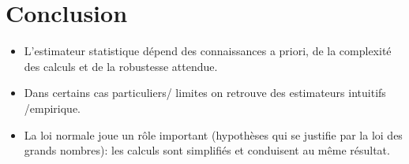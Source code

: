 \documentclass[main.tex]{subfiles}
\begin{document}
\section{Conclusion}
\begin{itemize}
\item L'estimateur statistique dépend des connaissances a priori, de la complexité des calculs et de la robustesse attendue.
\item Dans certains cas particuliers/ limites on retrouve des estimateurs intuitifs /empirique.
\item La loi normale joue un rôle important (hypothèses qui se justifie par la loi des grands nombres): les calculs sont simplifiés et conduisent au même résultat.

\end{itemize}
\end{document}
